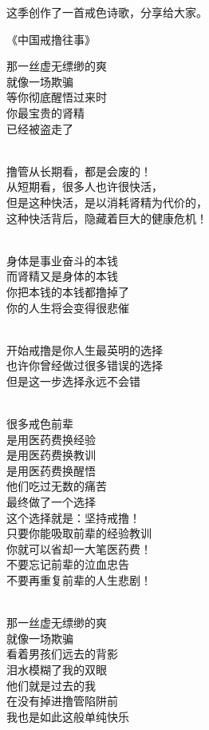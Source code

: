 这季创作了一首戒色诗歌，分享给大家。

\begin{center}
    《中国戒撸往事》\it
    \begin{multicols}{2}
        那一丝虚无缥缈的爽 \\ 就像一场欺骗 \\ 等你彻底醒悟过来时 \\ 你最宝贵的肾精 \\ 已经被盗走了

        ~\\

        撸管从长期看，都是会废的！ \\ 从短期看，很多人也许很快活， \\ 但是这种快活，是以消耗肾精为代价的， \\ 这种快活背后，隐藏着巨大的健康危机！

        ~\\

        身体是事业奋斗的本钱 \\ 而肾精又是身体的本钱 \\ 你把本钱的本钱都撸掉了 \\ 你的人生将会变得很悲催

        ~\\

        开始戒撸是你人生最英明的选择 \\ 也许你曾经做过很多错误的选择 \\ 但是这一步选择永远不会错

        ~\\

        很多戒色前辈 \\ 是用医药费换经验 \\ 是用医药费换教训 \\ 是用医药费换醒悟 \\ 他们吃过无数的痛苦 \\ 最终做了一个选择 \\ 这个选择就是：坚持戒撸！ \\ 只要你能吸取前辈的经验教训 \\ 你就可以省却一大笔医药费！ \\ 不要忘记前辈的泣血忠告 \\ 不要再重复前辈的人生悲剧！

        ~\\

        那一丝虚无缥缈的爽 \\ 就像一场欺骗 \\ 看着男孩们远去的背影 \\ 泪水模糊了我的双眼 \\ 他们就是过去的我 \\ 在没有掉进撸管陷阱前 \\ 我也是如此这般单纯快乐


\end{multicols}
\end{center}
